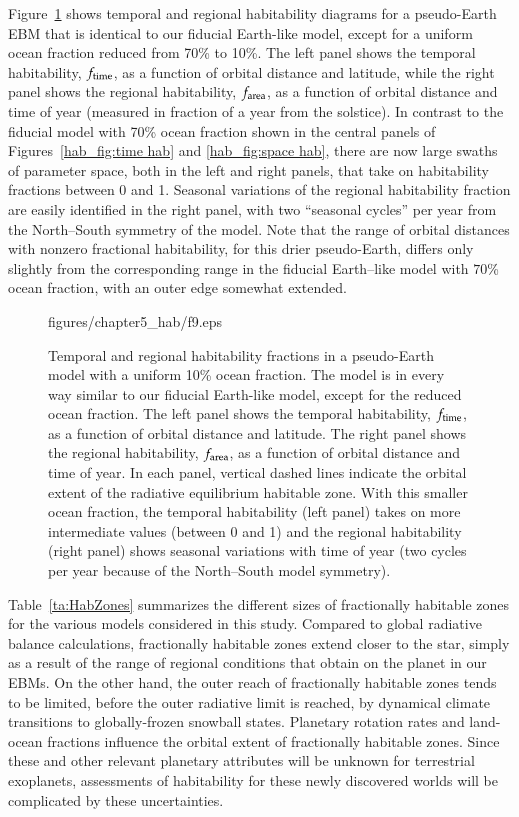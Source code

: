 Figure~\ref{hab_fig:10p water} shows temporal and regional
habitability diagrams for a pseudo-Earth EBM that is identical to our
fiducial Earth-like model, except for a uniform ocean fraction reduced
from 70\% to 10\%.  The left panel shows the temporal habitability,
$f_{\rm time}$, as a function of orbital distance and latitude, while
the right panel shows the regional habitability, $f_{\rm area}$, as a
function of orbital distance and time of year (measured in fraction of
a year from the solstice).  In contrast to the fiducial model with
70\% ocean fraction shown in the central panels of
Figures~\ref{hab_fig:time hab} and \ref{hab_fig:space hab}, there are
now large swaths of parameter space, both in the left and right
panels, that take on habitability fractions between 0 and 1.  Seasonal
variations of the regional habitability fraction are easily identified
in the right panel, with two ``seasonal cycles'' per year from the
North--South symmetry of the model. Note that the range of orbital
distances with nonzero fractional habitability, for this drier
pseudo-Earth, differs only slightly from the corresponding range in
the fiducial Earth--like model with $70$\% ocean fraction, with an
outer edge somewhat extended.
\begin{figure}[p]
\plotone
{figures/chapter5_hab/f9.eps}
\caption[Temporal and regional habitability fractions in a
pseudo-Earth model with a uniform 10\% ocean fraction.]{Temporal and
regional habitability fractions in a pseudo-Earth model with a uniform
10\% ocean fraction.  The model is in every way similar to our
fiducial Earth-like model, except for the reduced ocean fraction.  The
left panel shows the temporal habitability, $f_{\rm time}$, as a
function of orbital distance and latitude. The right panel shows the
regional habitability, $f_{\rm area}$, as a function of orbital
distance and time of year. In each panel, vertical dashed lines
indicate the orbital extent of the radiative equilibrium habitable
zone.  With this smaller ocean fraction, the temporal habitability
(left panel) takes on more intermediate values (between 0 and 1) and
the regional habitability (right panel) shows seasonal variations with
time of year (two cycles per year because of the North--South model
symmetry).}
\label{hab_fig:10p water}
\end{figure}
\afterpage{\clearpage}

Table~\ref{ta:HabZones} summarizes the different sizes of fractionally
habitable zones for the various models considered in this
study. Compared to global radiative balance calculations, fractionally
habitable zones extend closer to the star, simply as a result of the
range of regional conditions that obtain on the planet in our EBMs. On
the other hand, the outer reach of fractionally habitable zones tends
to be limited, before the outer radiative limit is reached, by
dynamical climate transitions to globally-frozen snowball states.
Planetary rotation rates and land-ocean fractions influence the
orbital extent of fractionally habitable zones.  Since these and other
relevant planetary attributes will be unknown for terrestrial
exoplanets, assessments of habitability for these newly discovered
worlds will be complicated by these uncertainties.

